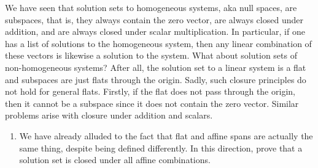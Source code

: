  We have seen that solution sets to homogeneous systems, aka null spaces, are subspaces, that is, they always contain the zero vector, are always closed under addition, and are always closed under scalar multiplication. In particular, if one has a list of solutions to the homogeneous system, then any linear combination of these vectors is likewise a solution to the system. What about solution sets of non-homogeneous systems? After all, the solution set to a linear system is a flat and subspaces are just flats through the origin. Sadly, such closure principles do not hold for general flats. Firstly, if the flat does not pass through the origin, then it cannot be a subspace since it does not contain the zero vector. Similar problems arise with closure under addition and scalars.
\begin{enumerate}[!HW!]
\itemspade Construct an example of a non-homogeneous system such that the sum of two solutions is not a solution. 
\itemspade Construct an example of a non-homogeneous system such that the scalar multiple of a solution is not a solution.
\itemspade Although solution sets of non-homogeneous systems are not closed under vector addition or scalar multiples, they are closed under lines, that is, if $\bb x_0$ and $\bb x_1$ are two distinct solutions to the non-homogeneous system then any vector on the line
\[\bb x = (1-t)\bb x_0 + t\bb x_1,\quad t\in F\] is likewise a solution to the system. Prove that solution sets are closed under lines.
\item We have already alluded to the fact that flat and affine spans are actually the same thing, despite being defined differently. In this direction, prove that a solution set is closed under all affine combinations.
\end{enumerate}

\pagebreak